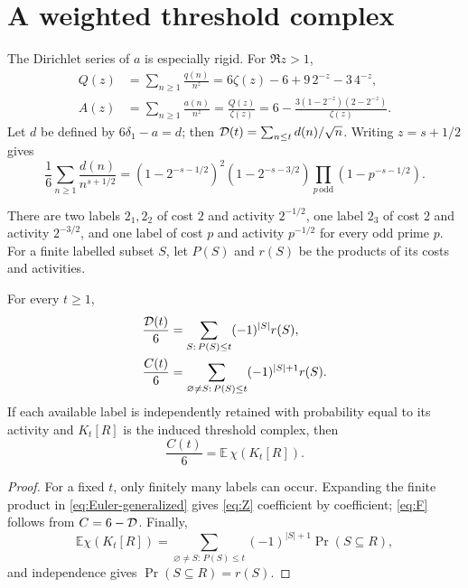 \section{A weighted threshold complex}

The Dirichlet series of $a$ is especially rigid.  For $\Re z>1$,
\begin{align}
 Q(z)&=\sum_{n\ge1}\frac{q(n)}{n^z}
 =6\zeta(z)-6+9\,2^{-z}-3\,4^{-z},\\
 A(z)&=\sum_{n\ge1}\frac{a(n)}{n^z}
 =\frac{Q(z)}{\zeta(z)}
 =6-\frac{3(1-2^{-z})(2-2^{-z})}{\zeta(z)}.
\end{align}
Let $d$ be defined by $6\delta_1-a=d$; then $\mathcal D(t)=\sum_{n\le t}d(n)/\sqrt n$.
Writing $z=s+1/2$ gives
\begin{equation}\label{eq:Euler-generalized}
 \frac16\sum_{n\ge1}\frac{d(n)}{n^{s+1/2}}
 =(1-2^{-s-1/2})^2(1-2^{-s-3/2})
  \prod_{p\,\mathrm{odd}}(1-p^{-s-1/2}).
\end{equation}

\begin{definition}
There are two labels $2_1,2_2$ of cost $2$ and activity $2^{-1/2}$, one label
$2_3$ of cost $2$ and activity $2^{-3/2}$, and one label of cost $p$ and
activity $p^{-1/2}$ for every odd prime $p$.
For a finite labelled subset $S$, let $P(S)$ and $r(S)$ be the products of its
costs and activities.
\end{definition}

\begin{theorem}\label{thm:Eulerchar}
For every $t\ge1$,
\begin{align}
 \frac{\mathcal D(t)}6&=\sum_{S:\,P(S)\le t}(-1)^{|S|}r(S),\label{eq:Z}\\
 \frac{C(t)}6&=\sum_{\varnothing\ne S:\,P(S)\le t}
                     (-1)^{|S|+1}r(S).\label{eq:F}
\end{align}
If each available label is independently retained with probability equal to
its activity and $K_t[R]$ is the induced threshold complex, then
\begin{equation}\label{eq:expectedchi}
 \boxed{\frac{C(t)}6=\mathbb E\,\chi(K_t[R]).}
\end{equation}
\end{theorem}
\begin{proof}
For a fixed $t$, only finitely many labels can occur.  Expanding the finite
product in \eqref{eq:Euler-generalized} gives \eqref{eq:Z} coefficient by
coefficient; \eqref{eq:F} follows from $C=6-\mathcal D$.  Finally,
\[
 \mathbb E\chi(K_t[R])
 =\sum_{\varnothing\ne S:\,P(S)\le t}(-1)^{|S|+1}\Pr(S\subseteq R),
\]
and independence gives $\Pr(S\subseteq R)=r(S)$.
\end{proof}

